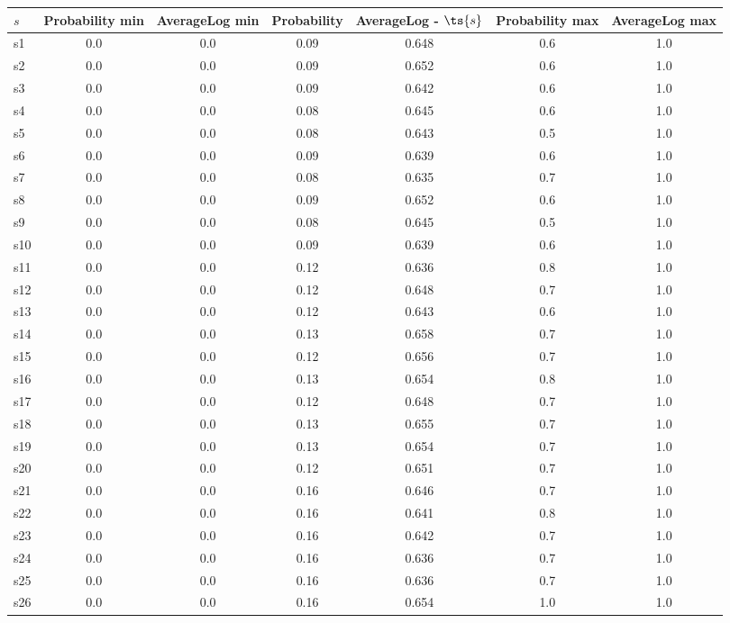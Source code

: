 \documentclass{article}
\begin{document}
\noindent\begin{tabular}{|l|c|c|c|c|c|c|}
\hline
$s$& Probability min & AverageLog min & Probability & AverageLog - $\ts{s}$ & Probability max & AverageLog max\\
\hline
s1 &0.0 & 0.0 & 0.09 & 0.648 & 0.6 & 1.0\\
\hline
s2 &0.0 & 0.0 & 0.09 & 0.652 & 0.6 & 1.0\\
\hline
s3 &0.0 & 0.0 & 0.09 & 0.642 & 0.6 & 1.0\\
\hline
s4 &0.0 & 0.0 & 0.08 & 0.645 & 0.6 & 1.0\\
\hline
s5 &0.0 & 0.0 & 0.08 & 0.643 & 0.5 & 1.0\\
\hline
s6 &0.0 & 0.0 & 0.09 & 0.639 & 0.6 & 1.0\\
\hline
s7 &0.0 & 0.0 & 0.08 & 0.635 & 0.7 & 1.0\\
\hline
s8 &0.0 & 0.0 & 0.09 & 0.652 & 0.6 & 1.0\\
\hline
s9 &0.0 & 0.0 & 0.08 & 0.645 & 0.5 & 1.0\\
\hline
s10 &0.0 & 0.0 & 0.09 & 0.639 & 0.6 & 1.0\\
\hline
s11 &0.0 & 0.0 & 0.12 & 0.636 & 0.8 & 1.0\\
\hline
s12 &0.0 & 0.0 & 0.12 & 0.648 & 0.7 & 1.0\\
\hline
s13 &0.0 & 0.0 & 0.12 & 0.643 & 0.6 & 1.0\\
\hline
s14 &0.0 & 0.0 & 0.13 & 0.658 & 0.7 & 1.0\\
\hline
s15 &0.0 & 0.0 & 0.12 & 0.656 & 0.7 & 1.0\\
\hline
s16 &0.0 & 0.0 & 0.13 & 0.654 & 0.8 & 1.0\\
\hline
s17 &0.0 & 0.0 & 0.12 & 0.648 & 0.7 & 1.0\\
\hline
s18 &0.0 & 0.0 & 0.13 & 0.655 & 0.7 & 1.0\\
\hline
s19 &0.0 & 0.0 & 0.13 & 0.654 & 0.7 & 1.0\\
\hline
s20 &0.0 & 0.0 & 0.12 & 0.651 & 0.7 & 1.0\\
\hline
s21 &0.0 & 0.0 & 0.16 & 0.646 & 0.7 & 1.0\\
\hline
s22 &0.0 & 0.0 & 0.16 & 0.641 & 0.8 & 1.0\\
\hline
s23 &0.0 & 0.0 & 0.16 & 0.642 & 0.7 & 1.0\\
\hline
s24 &0.0 & 0.0 & 0.16 & 0.636 & 0.7 & 1.0\\
\hline
s25 &0.0 & 0.0 & 0.16 & 0.636 & 0.7 & 1.0\\
\hline
s26 &0.0 & 0.0 & 0.16 & 0.654 & 1.0 & 1.0\\
\hline

\end{tabular}
\end{document}
